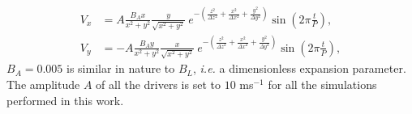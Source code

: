\begin{subequations}
\begin{align}
	V_x &= A \frac{B_Ax}{x^2 + y^2} \frac{y}{\sqrt{x^2 + y^2}}\ e^{-\left(\frac{z^2}{\Delta z^2} + \frac{x^2}{\Delta x^2} + \frac{y^2}{\Delta y^2}\right)} \sin \left(2\pi \frac{t}{P}\right),\\
	V_y &= - A \frac{B_Ay}{x^2 + y^2} \frac{x}{\sqrt{x^2 + y^2}}\ e^{-\left(\frac{z^2}{\Delta z^2} + \frac{x^2}{\Delta x^2} + \frac{y^2}{\Delta y^2}\right)} \sin \left(2\pi \frac{t}{P}\right),
	\label{eq:Sarch}
\end{align}
\end{subequations}
$B_A = 0.005$ is similar in nature to $B_L$, \textit{i.e.} a dimensionless expansion parameter.
The amplitude $A$ of all the drivers is set to $10$ ms$^{-1}$ for all the simulations performed in this work.

